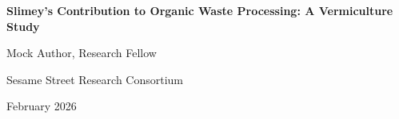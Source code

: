 \documentclass[11pt,letterpaper]{article}
\begin{document}
\begin{center}
{\LARGE\bfseries Slimey's Contribution to Organic Waste Processing: A Vermiculture Study\par}
\vspace{0.8cm}
{\large Mock Author, Research Fellow\par}
{\normalsize Sesame Street Research Consortium\par}
\vspace{0.3cm}
{\normalsize February 2026\par}
\vspace{0.8cm}
\end{center}

\begin{abstract}
\noindent
This paper presents a comprehensive study of worm-based organic waste processing and vermiculture optimization. Lorem cookie ipsum dolor sit amet, chocolate chip adipiscing elit. Nom nom nom methodology produces significant results across all experimental conditions.
\end{abstract}

\vspace{0.5cm}


\end{document}
